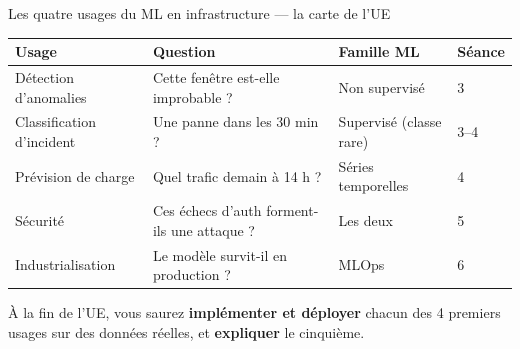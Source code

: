 \begin{frame}{Les quatre usages du ML en infrastructure --- la carte de l'UE}
\begin{center}
\small
\begin{tabular}{@{}p{3.4cm}p{5.2cm}p{2.2cm}p{3.4cm}@{}}
\toprule
\textbf{Usage} & \textbf{Question} & \textbf{Famille ML} & \textbf{Séance}\\
\midrule
Détection d'anomalies & Cette fenêtre est-elle improbable ? & Non supervisé & 3\\
\addlinespace[1pt]
Classification d'incident & Une panne dans les 30 min ? & Supervisé (classe rare) & 3--4\\
\addlinespace[1pt]
Prévision de charge & Quel trafic demain à 14 h ? & Séries temporelles & 4\\
\addlinespace[1pt]
Sécurité & Ces échecs d'auth forment-ils une attaque ? & Les deux & 5\\
\addlinespace[1pt]
Industrialisation & Le modèle survit-il en production ? & MLOps & 6\\
\bottomrule
\end{tabular}
\end{center}
\vspace{1mm}
\begin{kbox}
À la fin de l'UE, vous saurez \textbf{implémenter et déployer} chacun des
4 premiers usages sur des données réelles, et \textbf{expliquer} le cinquième.
\end{kbox}
\end{frame}

